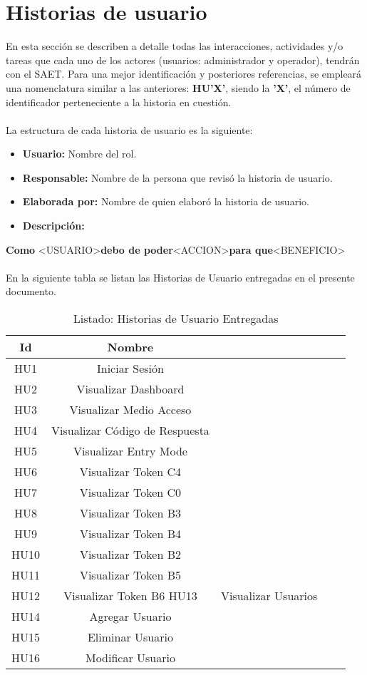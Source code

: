 \section{Historias de usuario}
En esta sección se describen a detalle todas las interacciones, actividades y/o tareas que cada uno de los actores (usuarios: administrador y operador), tendrán con el SAET. Para una mejor identificación y posteriores referencias, se empleará una nomenclatura similar a las anteriores: \textbf{HU'X'}, siendo la \textbf{'X'}, el número de identificador perteneciente a la historia en cuestión.
\\ \\
La estructura de cada historia de usuario es la siguiente: 
\begin{itemize}
	\item \textbf{Usuario:} Nombre del rol.
	\item \textbf{Responsable:} Nombre de la persona que revisó la historia de usuario.
	\item \textbf{Elaborada por:} Nombre de quien elaboró la historia de usuario.
	\item \textbf{Descripción:}
\end{itemize}
	\textbf{Como} \textless USUARIO\textgreater \textbf{debo de poder}\textless ACCION\textgreater \textbf{para que}\textless BENEFICIO\textgreater
	\\ \\
En la siguiente tabla se listan las Historias de Usuario entregadas en el presente documento.
\begin{table}[h]
	\begin{center}
		\begin{tabular}{|c|c|c|c|c|}
			\hline 
			\textbf{Id} & \textbf{Nombre} \\ 
			\hline 
			HU1 & Iniciar Sesión \\
			HU2 & Visualizar Dashboard \\
			HU3 & Visualizar Medio Acceso \\
			HU4 & Visualizar Código de Respuesta \\
			HU5 & Visualizar Entry Mode \\
			HU6 & Visualizar Token C4 \\
			HU7 & Visualizar Token C0 \\
			HU8 & Visualizar Token B3 \\
			HU9 & Visualizar Token B4 \\
			HU10 & Visualizar Token B2 \\
			HU11 & Visualizar Token B5 \\
			HU12 & Visualizar Token B6
			HU13 & Visualizar Usuarios \\
			HU14 & Agregar Usuario \\
			HU15 & Eliminar Usuario \\
			HU16 & Modificar Usuario \\
			\hline 
		\end{tabular}
	\end{center}
	\caption{Listado: Historias de Usuario Entregadas}
\end{table}
